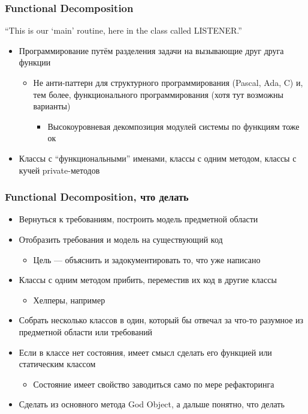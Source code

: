 \documentclass[xetex,mathserif,serif]{beamer}
\begin{document}
	\begin{frame}
		\frametitle{Functional Decomposition}
		``This is our ‘main’ routine, here in the class called LISTENER.''
		\begin{itemize}
			\item Программирование путём разделения задачи на вызывающие друг друга функции
			\begin{itemize}
				\item Не анти-паттерн для структурного программирования (Pascal, Ada, C) и, тем более, функционального программирования (хотя тут возможны варианты)
				\begin{itemize}
					\item Высокоуровневая декомпозиция модулей системы по функциям тоже ок
				\end{itemize}
			\end{itemize}
			\item Классы с ``функциональными'' именами, классы с одним методом, классы с кучей private-методов
		\end{itemize}
	\end{frame}

	\begin{frame}
		\frametitle{Functional Decomposition, что делать}
		\begin{itemize}
			\item Вернуться к требованиям, построить модель предметной области
			\item Отобразить требования и модель на существующий код
			\begin{itemize}
				\item Цель --- объяснить и задокументировать то, что уже написано
			\end{itemize}
			\item Классы с одним методом прибить, переместив их код в другие классы
			\begin{itemize}
				\item Хелперы, например
			\end{itemize}
			\item Собрать несколько классов в один, который бы отвечал за что-то разумное из предметной области или требований
			\item Если в классе нет состояния, имеет смысл сделать его функцией или статическим классом
			\begin{itemize}
				\item Состояние имеет свойство заводиться само по мере рефакторинга
			\end{itemize}
			\item Сделать из основного метода God Object, а дальше понятно, что делать
		\end{itemize}
	\end{frame}
\end{document}
